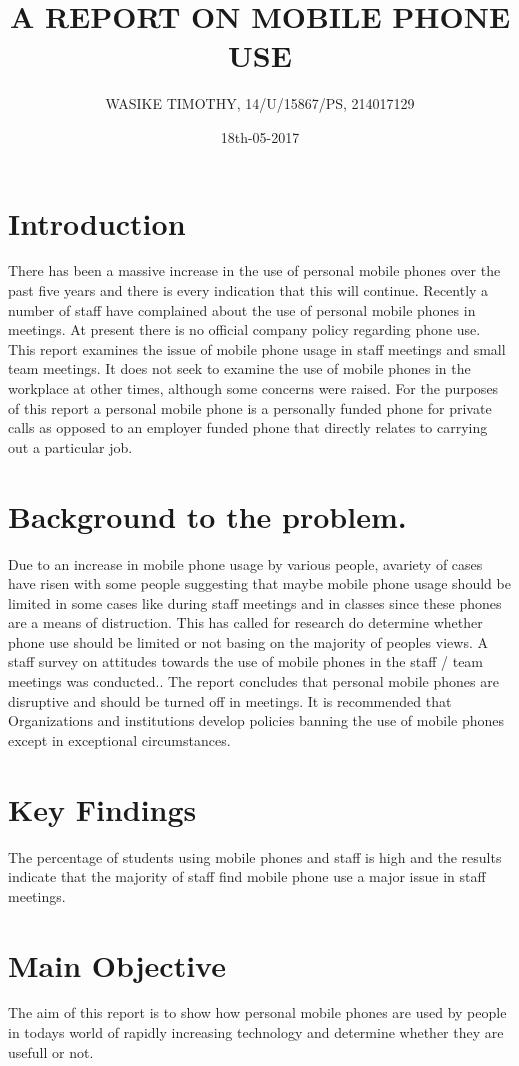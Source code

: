 \documentclass[12pt]{article}
\begin{document}
\title{ A REPORT ON MOBILE PHONE USE }
\author{WASIKE TIMOTHY,     14/U/15867/PS,     214017129}
\date{18th-05-2017}
\maketitle


\section{Introduction}   
There has been a massive increase in the use of personal mobile phones over the past five years and there is every indication that this will continue.  Recently a number of staff have complained about the use of personal mobile phones in meetings. At present there is no official company policy regarding phone use. This report examines the issue of mobile phone usage in staff meetings and small team meetings. It does not seek to examine the use of mobile phones in the workplace at other times, although some concerns were raised. For the purposes of this report a personal mobile phone is a personally funded phone for private calls as opposed to an employer funded phone that directly relates to carrying out a particular job.
   
   
\section{Background to the problem.}  
Due to an increase in mobile phone usage by various people, avariety of cases have risen with some people suggesting that maybe mobile phone usage should be limited in some cases like during staff meetings and in classes since these phones are a means of distruction. This has called for research do determine whether phone use should be limited or not basing on the majority of peoples views. A staff survey on attitudes towards the use of mobile phones in the staff / team meetings was conducted.. The report concludes that personal mobile phones are disruptive and should be turned off in meetings. It is recommended that Organizations and institutions develop policies banning the use of mobile phones except in exceptional circumstances.
\section{Key Findings}
The percentage of students using mobile phones and staff is high  and the results indicate that the majority of staff find mobile phone use a major issue in staff meetings.
\section{Main Objective}
The aim of this report is to show how personal mobile phones are used by people in todays world of rapidly increasing technology and determine whether they are usefull or not.
\end{document}
